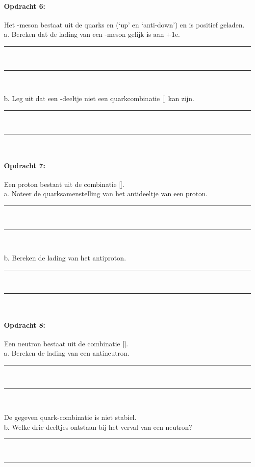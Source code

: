 \paragraph{Opdracht 6:}
Het \Ppiplus-meson bestaat uit de quarks \Pup en \APdown  (`up' en `anti-down')
en is positief geladen.\\
a. Bereken dat de lading van een \Ppiplus-meson gelijk is aan +1e.
\begin{center}
    \rule{\textwidth}{0.3mm}\\
    \rule{\textwidth}{0.3mm}\\
\end{center}
b. Leg uit dat een \PSigmaplus-deeltje niet een quarkcombinatie [\Pstrange\Pdown\Pdown] 
kan zijn.
\begin{center}
    \rule{\textwidth}{0.3mm}\\
    \rule{\textwidth}{0.3mm}\\
\end{center}

\paragraph{Opdracht 7:}
Een proton bestaat uit de combinatie [\Pup\Pup\Pdown].\\
a. Noteer de quarksamenstelling van het antideeltje van een proton.
\begin{center}
    \rule{\textwidth}{0.3mm}\\
    \rule{\textwidth}{0.3mm}\\
\end{center}
b. Bereken de lading van het antiproton.
\begin{center}
    \rule{\textwidth}{0.3mm}\\
    \rule{\textwidth}{0.3mm}\\
\end{center}

\paragraph{Opdracht 8:}
Een neutron bestaat uit de combinatie [\Pup\Pdown\Pdown].\\
a. Bereken de lading van een antineutron.
\begin{center}
    \rule{\textwidth}{0.3mm}\\
    \rule{\textwidth}{0.3mm}\\
\end{center}
De gegeven quark-combinatie is niet stabiel.\\
b. Welke drie deeltjes ontstaan bij het verval van een neutron?
\begin{center}
    \rule{\textwidth}{0.3mm}\\
    \rule{\textwidth}{0.3mm}\\
\end{center}

